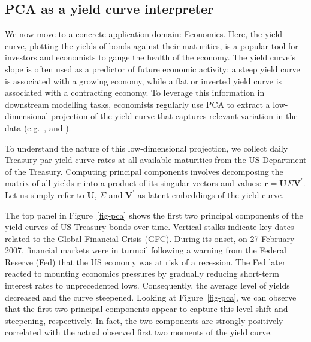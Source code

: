 \documentclass{article}
\theoremstyle{plain}
\theoremstyle{definition}
\theoremstyle{remark}
\begin{document}
\subsection{PCA as a yield curve interpreter}\label{example-principal-component-analysis}

We now move to a concrete application domain: Economics. Here, the yield curve, plotting the yields of bonds against their maturities, is a popular tool for investors and economists to gauge the health of the economy.
The yield curve's slope is often used as a predictor of future economic activity: a steep yield curve is associated with a growing economy, while a flat or inverted yield curve is associated with a contracting economy. %
To leverage this information in downstream modelling tasks, economists regularly use PCA to extract a low-dimensional projection of the yield curve that captures relevant variation in the data (e.g.\ \citet{berardi2022dissecting}, \citet{kumar2022effective} and \citet{crump2019deconstructing}).

To understand the nature of this low-dimensional projection, we collect daily Treasury par yield curve rates at all available maturities from the US Department of the Treasury. Computing principal components involves decomposing the matrix of all yields \(\mathbf{r}\) into a product of its singular vectors and values: \(\mathbf{r}=\mathbf{U}\Sigma\mathbf{V}^{\prime}\). Let us simply refer to \(\mathbf{U}\), \(\Sigma\) and \(\mathbf{V}^{\prime}\) as latent embeddings of the yield curve.

The top panel in Figure~\ref{fig-pca} shows the first two principal components of the yield curves of US Treasury bonds over time. Vertical stalks indicate key dates related to the Global Financial Crisis (GFC). During its onset, on 27 February 2007, financial markets were in turmoil following a warning from the Federal Reserve (Fed) that the US economy was at risk of a recession. The Fed later reacted to mounting economics pressures by gradually reducing short-term interest rates to unprecedented lows. Consequently, the average level of yields decreased and the curve steepened. Looking at Figure~\ref{fig-pca}, we can observe that the first two principal components appear to capture this level shift and steepening, respectively. In fact, the two components are strongly positively correlated with the actual observed first two moments of the yield curve.
\end{document}
